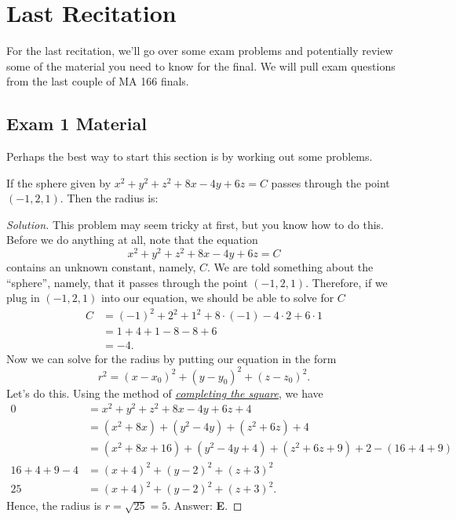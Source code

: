\chapter{Last Recitation}
For the last recitation, we'll go over some exam problems and potentially
review some of the material you need to know for the final. We will pull
exam questions from the last couple of MA 166 finals.

\section{Exam 1 Material}
Perhaps the best way to start this section is by working out some problems.
\begin{problem}
If the sphere given by $x^2+y^2+z^2+8x-4y+6z=C$ passes through the point
$(-1,2,1)$. Then the radius is:
\end{problem}
\begin{proof}[Solution]
This problem may seem tricky at first, but you know how to do this. Before
we do anything at all, note that the equation
\[
x^2+y^2+z^2+8x-4y+6z=C
\]
contains an unknown constant, namely, $C$. We are told something about the
``sphere'', namely, that it passes through the point $(-1,2,1)$. Therefore,
if we plug in $(-1,2,1)$ into our equation, we should be able to solve for
$C$
\begin{align*}
C&=(-1)^2+2^2+1^2+8\cdot(-1)-4\cdot 2+6\cdot 1\\
 &=1+4+1-8-8+6\\
 &=-4.
\end{align*}
Now we can solve for the radius by putting our equation in the form
\[
r^2=(x-x_0)^2+(y-y_0)^2+(z-z_0)^2.
\]
Let's do this. Using the method of
\href{https://en.wikipedia.org/wiki/Completing_the_square}{\emph{completing
  the square}}, we have
\begin{align*}
0&=x^2+y^2+z^2+8x-4y+6z+4\\
 &=(x^2+8x)+(y^2-4y)+(z^2+6z)+4\\
 &=(x^2+8x+16)+(y^2-4y+4)+(z^2+6z+9)+2-(16+4+9)\\
16+4+9-4&=(x+4)^2+(y-2)^2+(z+3)^2\\
25&=(x+4)^2+(y-2)^2+(z+3)^2.
\end{align*}
Hence, the radius is $r=\sqrt{25}=5$. Answer: \textbf{E}.
\end{proof}

